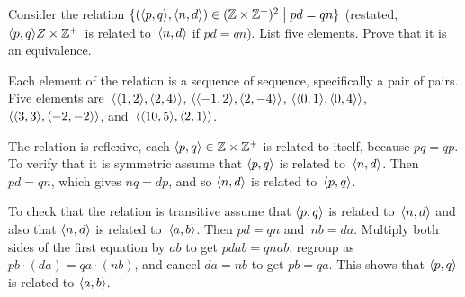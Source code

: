 \documentclass{ibl}  %
\begin{document}
\begin{problem} \label{RationalsAsEqClasses}
Consider the relation
$\{(\langle p,q\rangle,\langle n,d\rangle)\in (\mathbb{Z}\times\mathbb{Z}^+)^2 \bigm| pd=qn\}$
(restated, $\langle p,q\rangle\\Z\times\mathbb{Z}^+$\ is related to~$\langle n,d\rangle$
if $pd=qn$).
List five elements.
Prove that it is an equivalence.
\begin{answer}
Each element of the relation is a sequence of sequence, specifically a
pair of pairs.
Five elements are~$\langle\langle1,2\rangle,\langle2,4\rangle\rangle$, 
$\langle\langle-1,2\rangle,\langle2,-4\rangle\rangle$,  
$\langle\langle0,1\rangle,\langle0,4\rangle\rangle$,  
$\langle\langle3,3\rangle,\langle-2,-2\rangle\rangle$,  
and~$\langle\langle10,5\rangle,\langle2,1\rangle\rangle$.

The relation is reflexive, each $\langle p,q\rangle\in\mathbb{Z}\times\mathbb{Z}^+$ is 
related to itself, because $pq=qp$. 
To verify that it is symmetric assume that 
$\langle p,q\rangle$ is related to~$\langle n,d\rangle$.
Then $pd=qn$, which gives $nq=dp$,
and so $\langle n,d\rangle$ is related to~$\langle p,q\rangle$.

To check that the relation is transitive assume that 
$\langle p,q\rangle$ is related to~$\langle n,d\rangle$
and also that $\langle n,d\rangle$ is related to~$\langle a,b\rangle$.
Then $pd=qn$ and~$nb=da$.
Multiply both sides of the first equation by $ab$ to get $pdab=qnab$, regroup as
$pb\cdot(da)=qa\cdot(nb)$, and cancel $da=nb$ to get $pb=qa$.
This shows that $\langle p,q\rangle$ is related to $\langle a,b\rangle$.  
\end{answer}
\end{problem}

\end{document}
